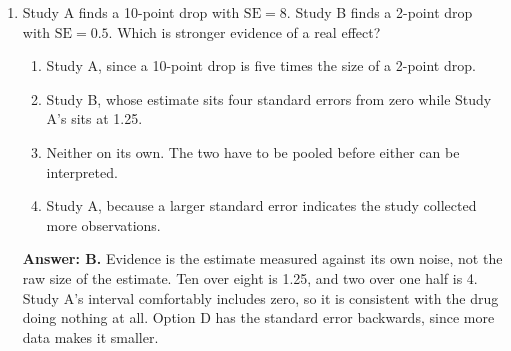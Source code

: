 \documentclass[11pt]{article}
\begin{document}
\begin{enumerate}[itemsep=14pt]
\begin{enumerate}[label=\Alph*., itemsep=1pt, topsep=3pt]
  \item The p-value is one-sided, so the correct figure to quote to readers would be 8 percent.
  \item Nothing is wrong. A p-value of 0.04 is the probability that the null hypothesis is true.
  \item The number is computed assuming the drug does nothing, so it cannot also be the chance that the drug does nothing.
  \item The sentence is acceptable as long as patients were randomly assigned, since randomization is what licenses a probability statement about the drug.
\end{enumerate}

\vspace{2pt}
\textbf{Answer: C.} The journalist reversed the conditional. A p-value is the probability of data this extreme given the null, not the probability of the null given the data. The honest reading is that if the drug did nothing, results this extreme would appear about 4 percent of the time. Getting the probability of a hypothesis needs a prior, which is Unit 11.
\vspace{4pt}

\item Study A finds a 10-point drop with $\mathrm{SE} = 8$. Study B finds a 2-point drop with $\mathrm{SE} = 0.5$. Which is stronger evidence of a real effect?

\begin{enumerate}[label=\Alph*., itemsep=1pt, topsep=3pt]
  \item Study A, since a 10-point drop is five times the size of a 2-point drop.
  \item Study B, whose estimate sits four standard errors from zero while Study A's sits at 1.25.
  \item Neither on its own. The two have to be pooled before either can be interpreted.
  \item Study A, because a larger standard error indicates the study collected more observations.
\end{enumerate}

\vspace{2pt}
\textbf{Answer: B.} Evidence is the estimate measured against its own noise, not the raw size of the estimate. Ten over eight is 1.25, and two over one half is 4. Study A's interval comfortably includes zero, so it is consistent with the drug doing nothing at all. Option D has the standard error backwards, since more data makes it smaller.
\vspace{4pt}


\end{enumerate}
\end{document}

